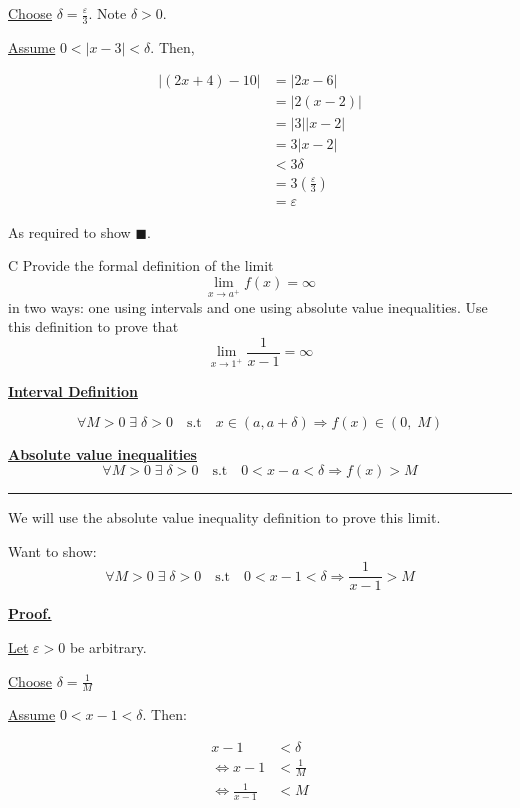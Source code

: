 \documentclass[]{article}
\begin{document}
\underline{Choose} $\delta = \frac{\varepsilon}{3}$. Note $\delta > 0$.

\medbreak

\underline{Assume} $0 < |x-3| < \delta$. Then, 

\begin{align*}
    |(2x + 4) -10| & = |2x-6| \\
    & = |2(x-2)| \\
    & = |3||x-2| \\
    & = 3|x-2| \\
    & < 3\delta \\
    & = 3(\frac{\varepsilon}{3}) \\
    & = \varepsilon
\end{align*}

As required to show $\blacksquare$.
\begin{question}{C}
    Provide the formal definition of the limit
    \[
    \lim_{x \to a^+} f(x) = \infty
    \]
    in two ways: one using intervals and one using absolute value inequalities. Use this definition to prove that
    \[
    \lim_{x \to 1^+} \frac{1}{x-1} = \infty
    \]
\end{question}


\underline{\bf{Interval Definition}}

\[
    \forall M > 0 \;\exists\;\delta > 0 \quad \text{s.t} \quad x \in(a, a+\delta)\Longrightarrow f(x) \in (0, \;M)
\]

\underline{\bf{Absolute value inequalities}}
\[
    \forall M > 0\;\exists\; \delta>0 \quad \text{s.t} \quad 
    0 < x-a < \delta \Longrightarrow f(x) >M
\]

\hrule
\vspace{0.1in}
We will use the absolute value inequality definition to prove this limit.

Want to show:
\[
    \forall M > 0\;\exists\; \delta>0 \quad \text{s.t} \quad 
    0 < x-1 < \delta \Longrightarrow \frac{1}{x-1} > M
\]


\underline{\bf{Proof.}}

\underline{Let} $\varepsilon > 0$ be arbitrary.

\medbreak

\underline{Choose} $\delta = \frac{1}{M}$

\medbreak

\underline{Assume} $0 < x-1 < \delta$. Then:

\begin{align*}
    x - 1 & < \delta \\
    \iff x - 1 & < \frac{1}{M} \\
    \iff \frac{1}{x-1} & < M
\end{align*}
\end{document}
